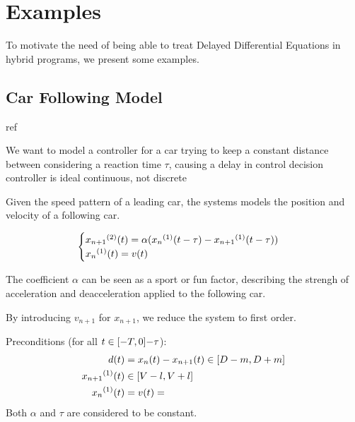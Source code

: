 \chapter{Examples}\label{sec:example-hp}

To motivate the need of being able to treat Delayed Differential Equations in hybrid programs, we present some examples.

\section{Car Following Model}

    ref

    We want to model a controller for a car
    trying to keep a constant distance between
    considering a reaction time $\tau$, causing a delay in control decision
    controller is ideal continuous, not discrete

    Given the speed pattern of a leading car, the systems models the position and velocity of a following car.

    \begin{equation*}
        \begin{cases}
            \D[2]{x_{n+1}}(t) = \alpha (\D{x_n}(t-\tau)-\D{x_{n+1}}(t-\tau))\\
            \D{x_n}(t) = v(t)
        \end{cases}
    \end{equation*}

    The coefficient $\alpha$ can be seen as a sport or fun factor, describing the strengh of acceleration and deacceleration applied to the following car.

    By introducing $v_{n+1}$ for $x_{n+1}$, we reduce the system to first order.

    Preconditions (for all $t\in[-T,0]{-\tau}$):
    \begin{align*}
        d(t) &= x_n(t)-x_{n+1}(t) \in\compactum{D-m}{D+m}\\
        \D{x_{n+1}}(t) &\in\compactum{V-l}{V+l}\\
        \D{x_n}(t) &= v(t) = 
    \end{align*}
    Both $\alpha$ and $\tau$ are considered to be constant.

